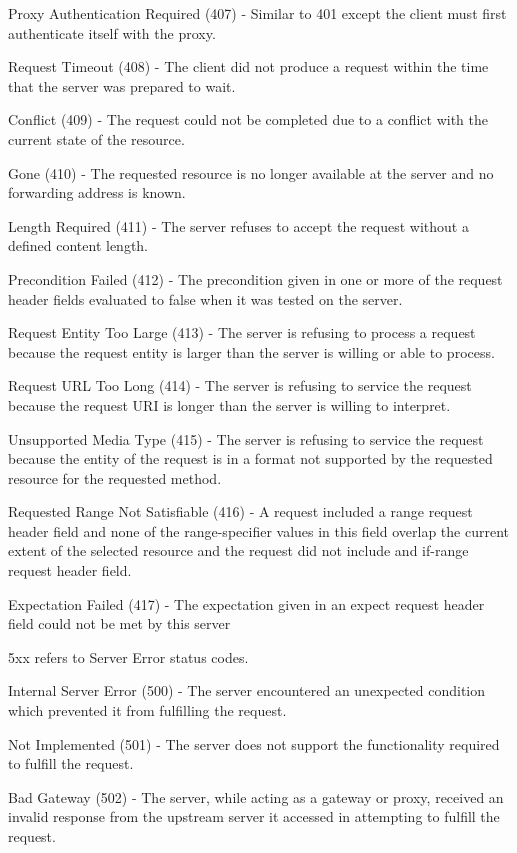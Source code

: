 \documentclass[12pt]{article}
\begin{document}
Proxy Authentication Required (407) - Similar to 401 except the client must first authenticate itself with the proxy.

Request Timeout (408) - The client did not produce a request within the time that the server was prepared to wait.

Conflict (409) - The request could not be completed due to a conflict with the current state of the resource.

Gone (410) - The requested resource is no longer available at the server and no forwarding address is known.

Length Required (411) - The server refuses to accept the request without a defined content length.

Precondition Failed (412) - The precondition given in one or more of the request header fields evaluated to false when it was tested on the server. 

Request Entity Too Large (413) - The server is refusing to process a request because the request entity is larger than the server is willing or able to process.

Request URL Too Long (414) - The server is refusing to service the request because the request URI is longer than the server is willing to interpret.

Unsupported Media Type (415) - The server is refusing to service the request because the entity of the request is in a format not supported by the requested resource for the requested method.

Requested Range Not Satisfiable (416) - A request included a range request header field and none of the range-specifier values in this field overlap the current extent of the selected resource and the request did not include and if-range request header field.

Expectation Failed (417) - The expectation given in an expect request header field could not be met by this server

5xx refers to Server Error status codes.

Internal Server Error (500) - The server encountered an unexpected condition which prevented it from fulfilling the request.

Not Implemented (501) - The server does not support the functionality required to fulfill the request.

Bad Gateway (502) - The server, while acting as a gateway or proxy, received an invalid response from the upstream server it accessed in attempting to fulfill the request.
\end{document}

